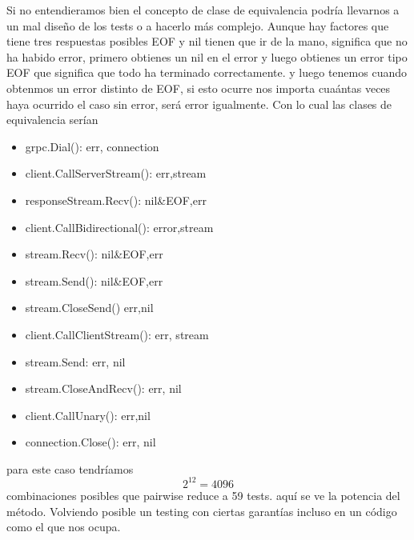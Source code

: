Si no entendieramos bien el concepto de clase de equivalencia podría llevarnos a un mal diseño de los tests o a hacerlo más complejo. Aunque hay factores que tiene tres respuestas posibles EOF y nil tienen que ir de la mano, significa que no ha habido error, primero obtienes un nil en el error y luego obtienes un error tipo EOF que significa que todo ha terminado correctamente. y luego tenemos cuando obtenmos un error distinto de EOF, si esto ocurre nos importa cuaántas veces haya ocurrido el caso sin error, será error igualmente. Con lo cual las clases de equivalencia serían

\begin{itemize}
    \item grpc.Dial(): err, connection
    \item client.CallServerStream(): err,stream
    \item responseStream.Recv(): nil\&EOF,err
    \item client.CallBidirectional(): error,stream
    \item stream.Recv(): nil\&EOF,err
    \item stream.Send(): nil\&EOF,err
    \item stream.CloseSend() err,nil
    \item client.CallClientStream(): err, stream
    \item stream.Send: err, nil
    \item stream.CloseAndRecv(): err, nil
    \item client.CallUnary(): err,nil
    \item connection.Close(): err, nil
\end{itemize}

para este caso tendríamos \[ 2^{12} = 4096 \] combinaciones posibles que pairwise reduce a 59 tests. aquí se ve la potencia del método. Volviendo posible un testing con ciertas garantías incluso en un código como el que nos ocupa.
